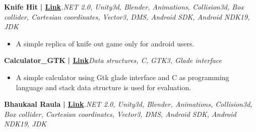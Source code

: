 \documentclass[a4paper]{article}
\begin{document}
          \vspace*{3mm}
      {\textbf{Knife Hit}}\textbf{ | \href{https://github.com/DarshanDEV1/BCA\_PROJECTS}{Link}}\hfill{\sl .NET 2.0, Unity3d, Blender, Animations, Collision3d, Box collider, Cartesian coordinates, Vector3, DMS, Android SDK, Android NDK19, JDK}\\
          \vspace{-3mm}
\begin{itemize} \itemsep -3pt
\item[] A simple replica of knife out game only for android users.
\end{itemize}
          \vspace*{3mm}
      {\textbf{Calculator\_GTK}}\textbf{ | \href{https://github.com/DarshanDEV1/SimpleCalculator-Using-C}{Link}}\hfill{\sl Data structures, C, GTK3, Glade interface}\\
          \vspace{-3mm}
\begin{itemize} \itemsep -3pt
\item[] A simple calculator using Gtk glade interface and C as programming language and stack data structure is used for evaluation.
\end{itemize}
          \vspace*{3mm}
      {\textbf{Bhaukaal Raula}}\textbf{ | \href{https://drive.google.com/file/d/17u6rGs43t2DiOKCY0Exy7tJMdEOzaRMX/view?usp=sharing}{Link}}\hfill{\sl .NET 2.0, Unity3d, Blender, Animations, Collision3d, Box collider, Cartesian coordinates, Vector3, DMS, Android SDK, Android NDK19, JDK}\\
\end{document}
